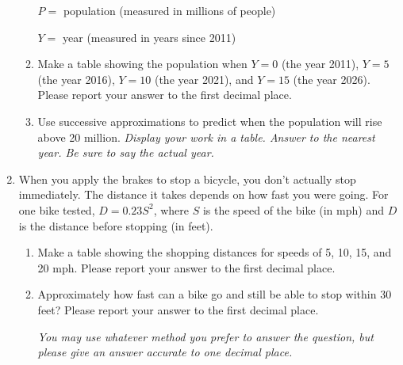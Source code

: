 \documentclass[12pt]{article}
\begin{document}
\begin{enumerate}
\begin{enumerate}
\quad $P= $ population (measured in millions of people)

\quad $Y = $ year (measured in years since 2011)

\vfill
\item Make a table showing the population when $Y=0$ (the year 2011), $Y=5$ (the year 2016), $Y=10$ (the year 2021), and $Y=15$ (the year 2026). Please report your answer to the first decimal place.
\vfill
\item Use successive approximations to predict when the population will rise above 20 million.    \emph{Display your work in a table.  Answer to the nearest year.  Be sure to say the actual year.}
\vfill
\vfill
\end{enumerate}

\newpage

\item When you apply the brakes to stop a bicycle, you don't actually stop immediately.  The distance it takes depends on how fast you were going.  For one bike tested, $D = 0.23 S^2$, where $S$ is the speed of the bike (in mph) and $D$ is the distance before stopping (in feet).

\begin{enumerate}
\item Make a table showing the shopping distances for speeds of 5, 10, 15, and 20 mph.  Please report your answer to the first decimal place.
\vfill
\item Approximately how fast can a bike go and still be able to stop within 30 feet?  Please report your answer to the first decimal place.

\emph{You may use whatever method you prefer to answer the question, but please give an answer accurate to one decimal place.}
\vfill

\end{enumerate}



\noindent \hrulefill


\end{enumerate}
\end{document}
